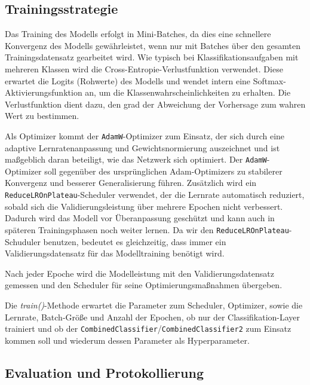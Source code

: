 \documentclass[12pt,oneside]{article}
\begin{document}
	\subsection{Trainingsstrategie}
	  Das Training des Modells erfolgt in Mini-Batches, da dies eine schnellere Konvergenz des Modells gewährleistet, wenn nur mit Batches über den gesamten Trainingsdatensatz gearbeitet wird. Wie typisch bei Klassifikationsaufgaben mit mehreren Klassen wird die Cross-Entropie-Verlustfunktion \cite{noauthor_crossentropyloss_nodate} verwendet. Diese erwartet die Logits (Rohwerte) des Modells und wendet intern eine Softmax-Aktivierungsfunktion an, um die Klassenwahrscheinlichkeiten zu erhalten. Die Verlustfunktion dient dazu, den grad der Abweichung der Vorhersage zum wahren Wert zu bestimmen. 
	  
	  Als Optimizer kommt der \texttt{AdamW}-Optimizer zum Einsatz, der sich durch eine adaptive Lernratenanpassung und Gewichtsnormierung auszeichnet und ist maßgeblich daran beteiligt, wie das Netzwerk sich optimiert. Der \texttt{AdamW}-Optimizer soll gegenüber des ursprünglichen Adam-Optimizers \cite{noauthor_adam_nodate} zu stabilerer Konvergenz und besserer Generalisierung führen. Zusätzlich wird ein \texttt{ReduceLROnPlateau}-Scheduler \cite{noauthor_reducelronplateau_nodate} verwendet, der die Lernrate automatisch reduziert, sobald sich die Validierungsleistung über mehrere Epochen nicht verbessert. Dadurch wird das Modell vor Überanpassung geschützt und kann auch in späteren Trainingsphasen noch weiter lernen. Da wir den \texttt{ReduceLROnPlateau}-Schuduler benutzen, bedeutet es gleichzeitig, dass immer ein Validierungsdatensatz für das Modelltraining benötigt wird.
	  
	  Nach jeder Epoche wird die Modelleistung mit den Validierungsdatensatz gemessen und den Scheduler für seine Optimierungsmaßnahmen übergeben.
	  
	  Die \textit{train()}-Methode erwartet die Parameter zum Scheduler, Optimizer, sowie die Lernrate, Batch-Größe und Anzahl der Epochen, ob nur der Classifikation-Layer trainiert und ob der \texttt{CombinedClassifier}/\texttt{CombinedClassifier2} zum Einsatz kommen soll und wiederum dessen Parameter als Hyperparameter. 
  
  
  
  	\subsection{Evaluation und Protokollierung}
\end{document}
